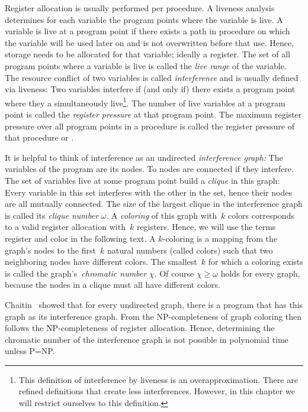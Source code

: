 {Register allocation is usually performed per procedure.
A liveness analysis determines for each variable the program points where the variable is live.
A variable is live at a program point if there exists a path in procedure on which the variable will be used later on and is not overwritten before that use.
Hence, storage needs to be allocated for that variable; ideally a register.
The set of all program points where a variable is live is called the \emph{live range} of the variable.
The resource conflict of two variables is called \emph{interference} and is usually defined via liveness:
Two variables interfere if (and only if) there exists a program point where they a simultaneously live\footnote{
This definition of interference by liveness is an overapproximation.
There are refined definitions that create less interferences.
However, in this chapter we will restrict ourselves to this definition.
}.
The number of live variables at a program point is called the \emph{register pressure} at that program point. 
The maximum register pressure over all program points in a procedure is called the register pressure of that procedure or \maxlive.

It is helpful to think of interference as an undirected \emph{interference graph:}
The variables of the program are its nodes.
To nodes are connected if they interfere.
The set of variables live at some program point build a \emph{clique} in this graph:
Every variable in this set interferes with the other in the set, hence their nodes are all mutually connected.
The size of the largest clique in the interference graph is called its \emph{clique number} $\omega$.
A \emph{coloring} of this graph with~$k$ colors corresponds to a valid register allocation with~$k$ registers.
Hence, we will use the terms register and color in the following text.
A $k$-coloring is a mapping from the graph's nodes to the first~$k$ natural numbers (called colors) such that two neighboring nodes have different colors.
The smallest~$k$ for which a coloring exists is called the graph's~\emph{chromatic number} $\chi$.
Of course $\chi\ge\omega$ holds for every graph, because the nodes in a clique must all have different colors.

Chaitin~\cite{chaitin:1981:register} showed that for every undirected graph, there is a program that has this graph as its interference graph.
From the NP-completeness of graph coloring then follows the NP-completeness of register allocation.
Hence, determining the chromatic number of the interference graph is not possible in polynomial time unless P=NP.

}
